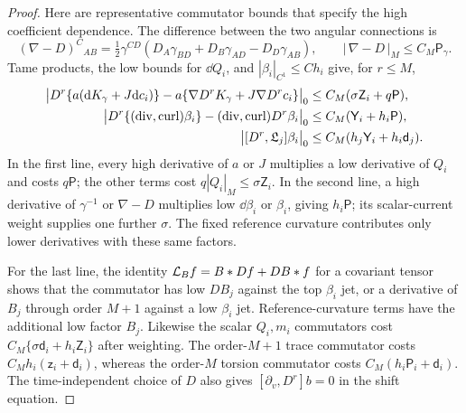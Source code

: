 \begin{proof}
Here are representative commutator bounds that specify the high
coefficient dependence.  The difference between the two angular
connections is
\[
 (\nabla-D)^C{}_{AB}
 =\tfrac12\gamma^{CD}
       (D_A\gamma_{BD}+D_B\gamma_{AD}-D_D\gamma_{AB}),
 \qquad |\,\nabla-D\,|_M\le C_M\mathsf P_\gamma.
\]
Tame products, the low bounds for $\dd Q_i$, and
$|\beta_i|_{C^1}\le C h_i$ give, for $r\le M$,
\begin{equation}\label{dn:high-commutators}
\begin{aligned}
 \big|D^r\{a(\mathrm d K_\gamma+J\mathrm d c_i)\}
      -a\{\nabla D^rK_\gamma+J\nabla D^rc_i\}\big|_0
   &\le C_M(\sigma\mathsf Z_i+q\mathsf P),\\
 \big|D^r\{(\operatorname{div},\operatorname{curl})\beta_i\}
             -(\operatorname{div},\operatorname{curl})D^r\beta_i\big|_0
   &\le C_M(\mathsf Y_i+h_i\mathsf P),\\
 \big|[D^r,\mathfrak L_j]\beta_i\big|_0
   &\le C_M(h_j\mathsf Y_i+h_i\mathsf d_j).
\end{aligned}
\end{equation}
In the first line, every high derivative of $a$ or $J$ multiplies a
low derivative of $Q_i$ and costs $q\mathsf P$; the other terms cost
$q|Q_i|_M\le\sigma\mathsf Z_i$.  In the second line, a high derivative
of $\gamma^{-1}$ or $\nabla-D$ multiplies low $\dd\beta_i$ or
$\beta_i$, giving $h_i\mathsf P$; its scalar-current weight supplies
one further $\sigma$.  The fixed reference curvature contributes only
lower derivatives with these same factors.

For the last line, the identity
$\mathcal L_B f=B*Df+DB*f$ for a covariant tensor shows that the
commutator has low $DB_j$ against the top $\beta_i$ jet, or a
derivative of $B_j$ through order $M+1$ against a low $\beta_i$ jet.
Reference-curvature terms have the additional low factor $B_j$.
Likewise the scalar $Q_i,m_i$ commutators cost
$C_M\{\sigma\mathsf d_i+h_i\mathsf Z_i\}$ after weighting.
The order-$M+1$ trace commutator costs
$C_Mh_i(\mathsf z_i+\mathsf d_i)$, whereas the order-$M$ torsion
commutator costs $C_M(h_i\mathsf P_i+\mathsf d_i)$.
The time-independent choice of $D$ also gives
$[\partial_v,D^r]b=0$ in the shift equation.


\end{proof}
